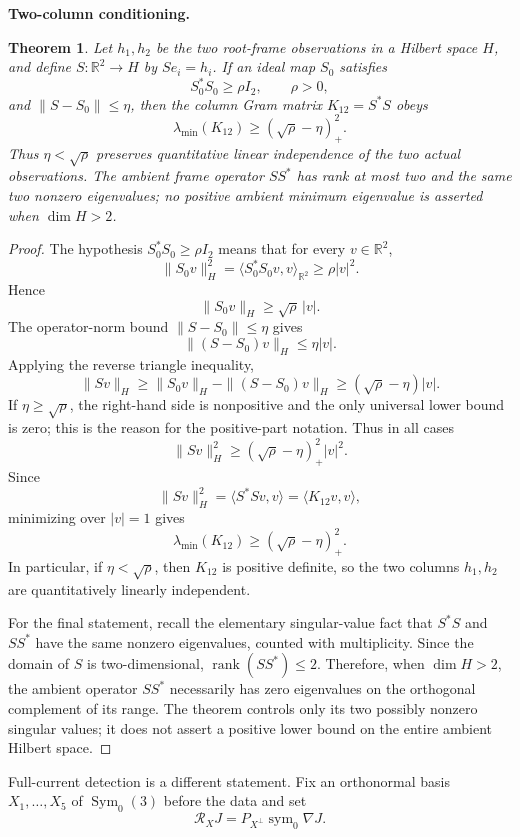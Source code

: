 \documentclass[11pt]{article}
\newtheorem{theorem}{Theorem}[section]
\theoremstyle{definition}\newtheorem{problem}[theorem]{Problem}
\theoremstyle{definition}
\theoremstyle{remark}
\newcommand{\R}{\mathbb R}
\begin{document}
\medskip
\noindent\textbf{Two-column conditioning.}
\begin{theorem}\label{thm:gb19}
Let $h_1,h_2$ be the two root-frame observations in a Hilbert space $H$, and define $S:\mathbb R^2\to H$ by $Se_i=h_i$.  If an ideal map $S_0$ satisfies
\[
S_0^*S_0\ge \rho I_2,\qquad \rho>0,
\]
and $\|S-S_0\|\le\eta$, then the column Gram matrix $K_{12}=S^*S$ obeys
\[
\boxed{\lambda_{\min}(K_{12})\ge(\sqrt\rho-\eta)_+^2.}
\]
Thus $\eta<\sqrt\rho$ preserves quantitative linear independence of the two actual observations.  The ambient frame operator $SS^*$ has rank at most two and the same two nonzero eigenvalues; no positive ambient minimum eigenvalue is asserted when $\dim H>2$.
\end{theorem}
\begin{proof}
The hypothesis \(S_0^*S_0\ge\rho I_2\) means that for every
\(v\in\R^2\),
\[
 \|S_0v\|_H^2
 =\langle S_0^*S_0v,v\rangle_{\R^2}
 \ge\rho|v|^2.
\]
Hence
\[
 \|S_0v\|_H\ge\sqrt\rho\,|v|.
\]
The operator-norm bound \(\|S-S_0\|\le\eta\) gives
\[
 \|(S-S_0)v\|_H\le\eta|v|.
\]
Applying the reverse triangle inequality,
\[
 \|Sv\|_H
 \ge \|S_0v\|_H-\|(S-S_0)v\|_H
 \ge(\sqrt\rho-\eta)|v|.
\]
If \(\eta\ge\sqrt\rho\), the right-hand side is nonpositive and the only
universal lower bound is zero; this is the reason for the positive-part
notation.  Thus in all cases
\[
 \|Sv\|_H^2\ge(\sqrt\rho-\eta)_+^2|v|^2.
\]
Since
\[
 \|Sv\|_H^2
 =\langle S^*Sv,v\rangle
 =\langle K_{12}v,v\rangle,
\]
minimizing over \(|v|=1\) gives
\[
 \lambda_{\min}(K_{12})
 \ge(\sqrt\rho-\eta)_+^2.
\]
In particular, if \(\eta<\sqrt\rho\), then \(K_{12}\) is positive definite,
so the two columns \(h_1,h_2\) are quantitatively linearly independent.

For the final statement, recall the elementary singular-value fact that
\(S^*S\) and \(SS^*\) have the same nonzero eigenvalues, counted with
multiplicity.  Since the domain of \(S\) is two-dimensional,
\(\operatorname{rank}(SS^*)\le2\).  Therefore, when \(\dim H>2\), the ambient
operator \(SS^*\) necessarily has zero eigenvalues on the orthogonal complement
of its range.  The theorem controls only its two possibly nonzero singular
values; it does not assert a positive lower bound on the entire ambient
Hilbert space.
\end{proof}

Full-current detection is a different statement.  Fix an orthonormal basis $X_1,\dots,X_5$ of $\operatorname{Sym}_0(3)$ before the data and set
\[
\mathcal R_XJ=P_{X^\perp}\operatorname{sym}_0\nabla J.
\]
\end{document}
